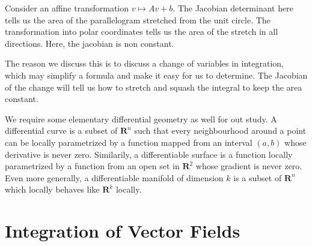 Consider an affine transformation $v \mapsto Av + b$. The Jacobian determinant here tells us the area of the parallelogram stretched from the unit circle. The transformation into polar coordinates tells us the area of the stretch in all directions. Here, the jacobian is non constant.

The reason we discuss this is to discuss a change of variables in integration, which may simplify a formula and make it easy for us to determine. The Jacobian of the change will tell us how to stretch and squash the integral to keep the area constant.

We require some elementary differential geometry as well for out study. A differential curve is a subset of $\mathbf{R}^n$ such that every neighbourhood around a point can be locally parametrized by a function mapped from an interval $(a,b)$ whose derivative is never zero. Similarily, a differentiable surface is a function locally parametrized by a function from an open set in $\mathbf{R}^2$ whose gradient is never zero. Even more generally, a differentiable manifold of dimension $k$ is a subset of $\mathbf{R}^n$ which locally behaves like $\mathbf{R}^k$ locally.










\chapter{Integration of Vector Fields}

